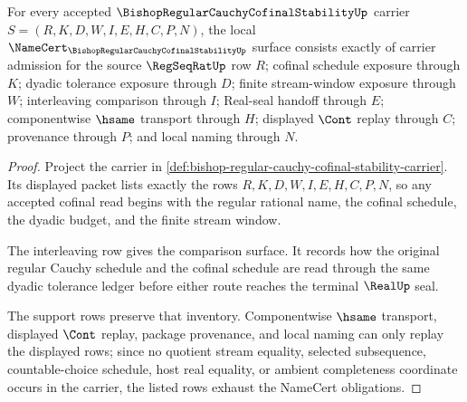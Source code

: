\begin{theorem}
\label{thm:bishop-regular-cauchy-cofinal-stability-namecert-obligations}
For every accepted $\BishopRegularCauchyCofinalStabilityUp$ carrier $S=(R,K,D,W,I,E,H,C,P,N)$, the local $\NameCert_{\BishopRegularCauchyCofinalStabilityUp}$ surface consists exactly of carrier admission for the source $\RegSeqRatUp$ row $R$; cofinal schedule exposure through $K$; dyadic tolerance exposure through $D$; finite stream-window exposure through $W$; interleaving comparison through $I$; Real-seal handoff through $E$; componentwise $\hsame$ transport through $H$; displayed $\Cont$ replay through $C$; provenance through $P$; and local naming through $N$.
\end{theorem}
\begin{proof}
Project the carrier in \autoref{def:bishop-regular-cauchy-cofinal-stability-carrier}. Its displayed packet lists exactly the rows $R,K,D,W,I,E,H,C,P,N$, so any accepted cofinal read begins with the regular rational name, the cofinal schedule, the dyadic budget, and the finite stream window.

The interleaving row gives the comparison surface. It records how the original regular Cauchy schedule and the cofinal schedule are read through the same dyadic tolerance ledger before either route reaches the terminal $\RealUp$ seal.

The support rows preserve that inventory. Componentwise $\hsame$ transport, displayed $\Cont$ replay, package provenance, and local naming can only replay the displayed rows; since no quotient stream equality, selected subsequence, countable-choice schedule, host real equality, or ambient completeness coordinate occurs in the carrier, the listed rows exhaust the NameCert obligations.
\end{proof}

